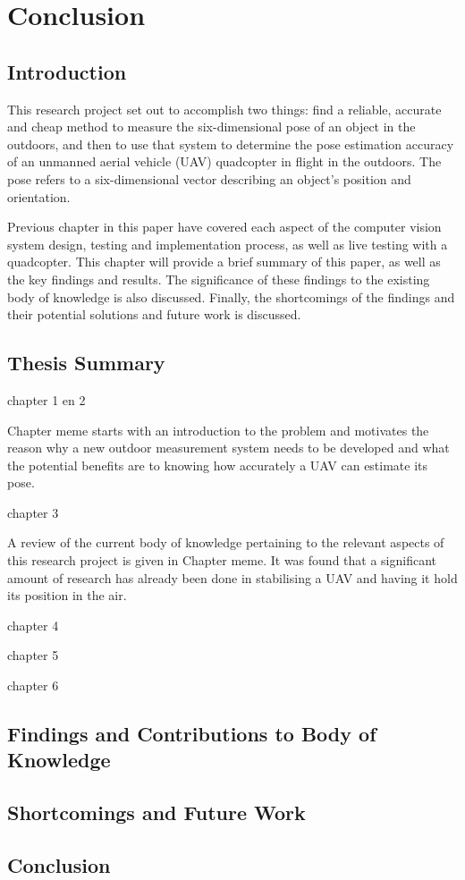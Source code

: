 \chapter{Conclusion}

\section{Introduction}

This research project set out to accomplish two things: find a reliable, accurate and cheap method to measure the six-dimensional pose of an object in the outdoors, and then to use that system to determine the pose estimation accuracy of an unmanned aerial vehicle (UAV) quadcopter in flight in the outdoors. The pose refers to a six-dimensional vector describing an object's position and orientation. 

Previous chapter in this paper have covered each aspect of the computer vision system design, testing and implementation process, as well as live testing with a quadcopter. This chapter will provide a brief summary of this paper, as well as the key findings and results. The significance of these findings to the existing body of knowledge is also discussed. Finally, the shortcomings of the findings and their potential solutions and future work is discussed. 

\section{Thesis Summary}

chapter 1 en 2

Chapter meme starts with an introduction to the problem and motivates the reason why a new outdoor measurement system needs to be developed and what the potential benefits are to knowing how accurately a UAV can estimate its pose.  

chapter 3

A review of the current body of knowledge pertaining to the relevant aspects of this research project is given in Chapter meme. It was found that a significant amount of research has already been done in stabilising a UAV and having it hold its position in the air. 

chapter 4

chapter 5

chapter 6

\section{Findings and Contributions to Body of Knowledge}

\section{Shortcomings and Future Work}

\section{Conclusion}
